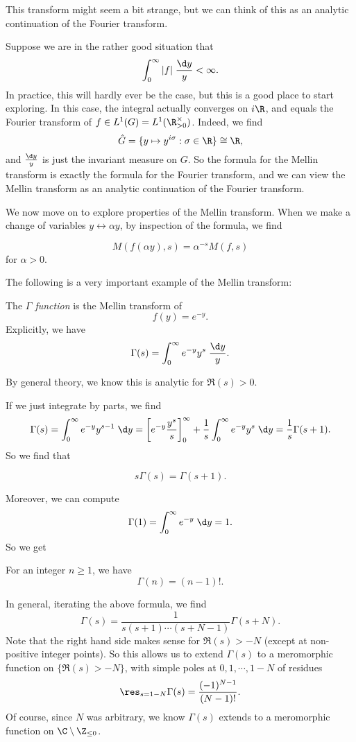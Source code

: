 \documentclass[a4paper]{article}
\begin{document}
This transform might seem a bit strange, but we can think of this as an analytic continuation of the Fourier transform.
\begin{eg}
  Suppose we are in the rather good situation that
  \[
    \int_0^\infty |f| \;\frac{\d y}{y} < \infty.
  \]
  In practice, this will hardly ever be the case, but this is a good place to start exploring. In this case, the integral actually converges on $i\R$, and equals the Fourier transform of $f \in L^1(G) = L^1(\R^\times_{>0})$. Indeed, we find
  \[
    \hat{G} = \{y \mapsto y^{i\sigma} : \sigma \in \R\} \cong \R,
  \]
  and $\frac{\d y}{y}$ is just the invariant measure on $G$. So the formula for the Mellin transform is exactly the formula for the Fourier transform, and we can view the Mellin transform as an analytic continuation of the Fourier transform.
\end{eg}
We now move on to explore properties of the Mellin transform. When we make a change of variables $y \leftrightarrow \alpha y$, by inspection of the formula, we find
\begin{prop}
  \[
    M(f(\alpha y), s) = \alpha^{-s} M(f, s)
  \]
  for $\alpha > 0$.
\end{prop}

The following is a very important example of the Mellin transform:
\begin{defi}
  The \emph{$\Gamma$ function} is the Mellin transform of
  \[
    f(y) = e^{-y}.
  \]
  Explicitly, we have
  \[
    \Gamma(s) = \int_0^\infty e^{-y} y^s \;\frac{\d y}{y}.
  \]
\end{defi}
By general theory, we know this is analytic for $\Re(s) > 0$.

If we just integrate by parts, we find
\[
  \Gamma(s) = \int_0^\infty e^{-y} y^{s - 1}\;\d y = \left[e^{-y} \frac{y^s}{s} \right]_0^\infty + \frac{1}{s}\int_0^\infty e^{-y} y^s \;\d y = \frac{1}{s}\Gamma(s + 1).
\]
So we find that
\begin{prop}
  \[
    s \Gamma(s) = \Gamma(s + 1).
  \]
\end{prop}
Moreover, we can compute
\[
  \Gamma(1) = \int_0^\infty e^{-y}\;\d y = 1.
\]
So we get
\begin{prop}
  For an integer $n \geq 1$, we have
  \[
    \Gamma(n) = (n - 1)!.
  \]
\end{prop}
In general, iterating the above formula, we find
\[
  \Gamma(s) = \frac{1}{s (s + 1) \cdots (s + N - 1)} \Gamma(s + N).
\]
Note that the right hand side makes sense for $\Re(s) > -N$ (except at non-positive integer points). So this allows us to extend $\Gamma(s)$ to a meromorphic function on $\{\Re(s) > -N\}$, with simple poles at $0, 1, \cdots, 1 - N$ of residues
\[
  \res_{s = 1 - N} \Gamma(s) = \frac{(-1)^{N - 1}}{(N - 1)!}.
\]
Of course, since $N$ was arbitrary, we know $\Gamma(s)$ extends to a meromorphic function on $\C \setminus \Z_{\leq 0}$.
\end{document}
